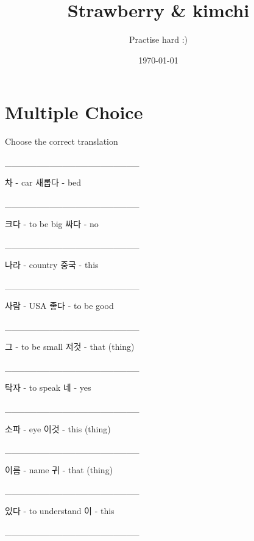 \documentclass[addpoints, 30pt]{../exam}%
\title{Strawberry \& kimchi}%
\author{Practise hard :)}%
\date{\today}%
\begin{document}
%
\normalsize%
\maketitle%
\section{Multiple Choice}%
Choose the correct translation%
\begin{questions}%
\question[1]%
\_\_\_\_\_\_\_\_\_\_\_\_\_\_\_\_\_\_\_\_\_%
\begin{choices}%
\CorrectChoice%
차 {-} car%
\choice%
새롭다 {-} bed%
\end{choices}%
\question[1]%
\_\_\_\_\_\_\_\_\_\_\_\_\_\_\_\_\_\_\_\_\_%
\begin{choices}%
\CorrectChoice%
크다 {-} to be big%
\choice%
싸다 {-} no%
\end{choices}%
\question[1]%
\_\_\_\_\_\_\_\_\_\_\_\_\_\_\_\_\_\_\_\_\_%
\begin{choices}%
\CorrectChoice%
나라 {-} country%
\choice%
중국 {-} this%
\end{choices}%
\question[1]%
\_\_\_\_\_\_\_\_\_\_\_\_\_\_\_\_\_\_\_\_\_%
\begin{choices}%
\choice%
사람 {-} USA%
\CorrectChoice%
좋다 {-} to be good%
\end{choices}%
\question[1]%
\_\_\_\_\_\_\_\_\_\_\_\_\_\_\_\_\_\_\_\_\_%
\begin{choices}%
\choice%
그 {-} to be small%
\CorrectChoice%
저것 {-} that (thing)%
\end{choices}%
\question[1]%
\_\_\_\_\_\_\_\_\_\_\_\_\_\_\_\_\_\_\_\_\_%
\begin{choices}%
\choice%
탁자 {-} to speak%
\CorrectChoice%
네 {-} yes%
\end{choices}%
\question[1]%
\_\_\_\_\_\_\_\_\_\_\_\_\_\_\_\_\_\_\_\_\_%
\begin{choices}%
\choice%
소파 {-} eye%
\CorrectChoice%
이것 {-} this (thing)%
\end{choices}%
\question[1]%
\_\_\_\_\_\_\_\_\_\_\_\_\_\_\_\_\_\_\_\_\_%
\begin{choices}%
\CorrectChoice%
이름 {-} name%
\choice%
귀 {-} that (thing)%
\end{choices}%
\question[1]%
\_\_\_\_\_\_\_\_\_\_\_\_\_\_\_\_\_\_\_\_\_%
\begin{choices}%
\choice%
있다 {-} to understand%
\CorrectChoice%
이 {-} this%
\end{choices}%
\question[1]%
\_\_\_\_\_\_\_\_\_\_\_\_\_\_\_\_\_\_\_\_\_%
\begin{choices}%

\end{choices}
\end{questions}
\end{document}
